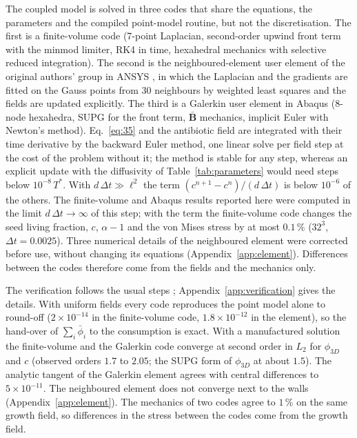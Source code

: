 \documentclass[11pt,a4paper]{article}
\newcommand{\phiD}{\phi_{3D}}
\newcommand{\lv}{\textstyle\sum_i\bar\phi_i}
\begin{document}
The coupled model is solved in three codes that share the equations, the parameters and the compiled point-model routine, but not the discretisation. The first is a finite-volume code (7-point Laplacian, second-order upwind front term with the minmod limiter, RK4 in time, hexahedral mechanics with selective reduced integration). The second is the neighboured-element user element of the original authors' group in ANSYS \citep{Blaszczyk2022TaylorWLS,Rudolf2025NEM}, in which the Laplacian and the gradients are fitted on the Gauss points from 30 neighbours by weighted least squares and the fields are updated explicitly. The third is a Galerkin user element in Abaqus (8-node hexahedra, SUPG \citep{BrooksHughes1982SUPG} for the front term, $\bar{\mathbf B}$ mechanics, implicit Euler with Newton's method). Eq.~\eqref{eq:35} and the antibiotic field are integrated with their time derivative by the backward Euler method, one linear solve per field step at the cost of the problem without it; the method is stable for any step, whereas an explicit update with the diffusivity of Table~\ref{tab:parameters} would need steps below $10^{-8}\,T^*$. With $d\,\Delta t\gg\ell^2$ the term $(c^{n+1}-c^n)/(d\,\Delta t)$ is below $10^{-6}$ of the others. The finite-volume and Abaqus results reported here were computed in the limit $d\,\Delta t\to\infty$ of this step; with the term the finite-volume code changes the seed living fraction, $c$, $\alpha-1$ and the von Mises stress by at most $0.1\,\%$ ($32^3$, $\Delta t=0.0025$). Three numerical details of the neighboured element were corrected before use, without changing its equations (Appendix~\ref{app:element}). Differences between the codes therefore come from the fields and the mechanics only.

The verification follows the usual steps \citep{Roache2002MMS,Celik2008GCI}; Appendix~\ref{app:verification} gives the details. With uniform fields every code reproduces the point model alone to round-off ($2\times10^{-14}$ in the finite-volume code, $1.8\times10^{-12}$ in the element), so the hand-over of $\lv$ to the consumption is exact. With a manufactured solution the finite-volume and the Galerkin code converge at second order in $L_2$ for $\phiD$ and $c$ (observed orders $1.7$ to $2.05$; the SUPG form of $\phiD$ at about $1.5$). The analytic tangent of the Galerkin element agrees with central differences to $5\times10^{-11}$. The neighboured element does not converge next to the walls (Appendix~\ref{app:element}). The mechanics of two codes agree to $1\,\%$ on the same growth field, so differences in the stress between the codes come from the growth field.
\end{document}
